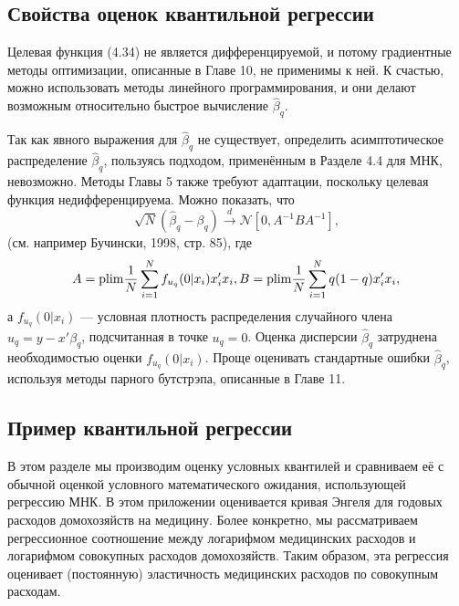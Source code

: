 \subsection{Свойства оценок квантильной регрессии}

Целевая функция (4.34) не является дифференцируемой, и потому градиентные методы оптимизации, описанные в Главе 10, не применимы к ней. К счастью, можно использовать методы линейного программирования, и они делают возможным относительно быстрое вычисление $\hat{\beta}_q$.

Так как явного выражения для $\hat{\beta}_q$ не существует, определить асимптотическое распределение $\hat{\beta}_q$, пользуясь подходом, применённым в Разделе 4.4 для МНК, невозможно. Методы Главы 5 также требуют адаптации, поскольку целевая функция недифференцируема. Можно показать, что 
\begin{equation}
\sqrt{N}(\hat{\beta}_q-\beta_q)  \xrightarrow{d} \mathcal{N} [0, A^{-1}BA^{-1}],
\end{equation}
(см. например Бучински, 1998, стр. 85), где 
\begin{equation}
A = \mathrm{plim } \frac{1}{N} \sum_{i=1}^{N} f_{u_{q}}(0|x_i)x_i'x_i, \\
B = \mathrm{plim } \frac{1}{N} \sum_{i=1}^{N}q(1-q)x_i'x_i, \\
\end{equation}
а $f_{u_{q}}(0|x_i)$ --- условная плотность распределения случайного члена $u_q = y -x'\beta_q$, подсчитанная в точке $u_q = 0$. Оценка дисперсии $\hat{\beta}_q$ затруднена необходимостью оценки  $f_{u_{q}}(0|x_i)$. Проще оценивать стандартные ошибки $\hat{\beta}_q$, используя методы парного бутстрэпа, описанные в Главе 11.

\subsection{Пример квантильной регрессии}

В этом разделе мы производим оценку условных квантилей и сравниваем её с обычной оценкой условного математического ожидания, использующей регрессию МНК. В этом приложении оценивается кривая Энгеля для годовых расходов домохозяйств на медицину. Более конкретно, мы рассматриваем регрессионное соотношение между логарифмом медицинских расходов и логарифмом совокупных расходов домохозяйств. Таким образом, эта регрессия оценивает (постоянную) эластичность медицинских расходов по совокупным расходам.


